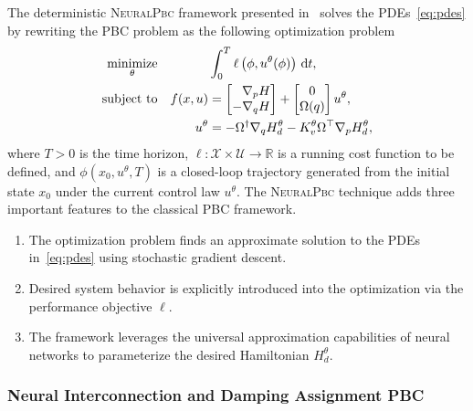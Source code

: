 The deterministic \textsc{NeuralPbc} framework presented in~\cite{neuralpbc}
solves the PDEs~\eqref{eq:pdes} by rewriting the PBC problem as the following 
optimization problem
\begin{equation}
  \begin{aligned}
      \underset{\theta}{\textrm{minimize}} 
      & & &\int_{0}^{T} \ell \left(\phi,u^{\theta}(\phi) \right) \, \dd t , \\%
      \textrm{subject to}
      & & f(x, u) &= \bmat{\phantom{-}\nabla_p H \\ -\nabla_q H} + \bmat{0 \\ \Omega(q)}u^{\theta}, \\%
      & & u^{\theta} &= -\Omega^{\dagger} \nabla_q H_d^{\theta} - K_v^{\theta} \Omega^\top \nabla_p H_d^{\theta},%
  \end{aligned}
  \label{eq:neural_pbc_finite_optim}
\end{equation}
where $T>0$ is the time horizon, $\ell: \mathcal{X} \times \mathcal{U}
\rightarrow \mathbb{R}$ is a running cost function to be defined, and $\phi(
x_0, u^\theta, T)$ is a closed-loop trajectory generated from the initial state
$x_0$ under the current control law $u^\theta$.
%
The \textsc{NeuralPbc} technique adds three important features to the classical 
PBC framework.
\begin{enumerate}
  \item The optimization problem finds an approximate solution to the PDEs
  in~\eqref{eq:pdes} using stochastic gradient descent.
  \item Desired system behavior is explicitly introduced into the optimization
  via the performance objective $\ell$.
  \item The framework leverages the universal approximation capabilities of
  neural networks to parameterize the desired Hamiltonian $H^\theta_d$.
\end{enumerate}

\subsubsection{Neural Interconnection and Damping Assignment PBC}

